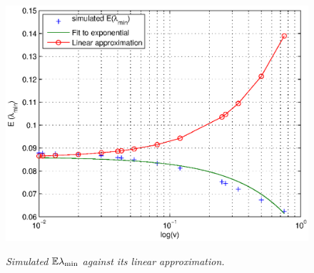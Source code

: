 \documentclass{article}
\begin{document}
\begin{figure}[htb!]
{    \includegraphics[scale=0.35]{../pics/lambda_min_q0.5.eps}
    \label{fig:lambda_min_q0.5}
  }
  \caption{\small \it Simulated $\mathbb{E} \lambda_{\text{min}}$ against its linear
    approximation.}
  \label{fig:lambda_min_verified}
\end{figure}




\end{document}
